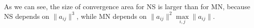 \documentclass[12pt]{article}
\begin{document}
As we can see, the size of convergence area for {\sf NS} is larger than for {\sf MN}, because {\sf NS} depends on $\|a_{ij}\|^3$, while {\sf MN} depends on $\|a_{ij}\|^2\max\limits_{i,j}\|a_{ij}\|$. 




\clearpage






\end{document}
